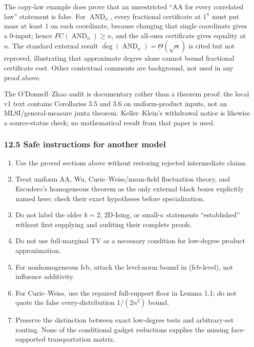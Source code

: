 The copy-law example does prove that an unrestricted ``AA for every correlated law'' statement is false. For \(\operatorname{AND}_n\), every fractional certificate at \(1^n\) must put mass at least \(1\) on each coordinate, because changing that single coordinate gives a 0-input; hence \(FC(\operatorname{AND}_n)\ge n\), and the all-ones certificate gives equality at \(n\). The standard external result \(\widetilde{\deg}(\operatorname{AND}_n)=\Theta(\sqrt n)\) is cited but not reproved, illustrating that approximate degree alone cannot bound fractional certificate cost. Other contextual comments are background, not used in any proof above.

The O'Donnell--Zhao audit is documentary rather than a theorem proof: the local v1 text contains Corollaries 3.5 and 3.6 on uniform-product inputs, not an MLSI/general-measure junta theorem. Keller--Klein's withdrawal notice is likewise a source-status check; no mathematical result from that paper is used.

\subsubsection{12.5 Safe instructions for another model}\label{safe-instructions-for-another-model}

\begin{enumerate}
\def\labelenumi{\arabic{enumi}.}
\tightlist
\item
  Use the proved sections above without restoring rejected intermediate claims.
\item
  Treat uniform AA, Wu, Curie--Weiss/mean-field fluctuation theory, and Escudero's homogeneous theorem as the only external black boxes explicitly named here; check their exact hypotheses before specialization.
\item
  Do not label the older \(k=2\), 2D-Ising, or small-\(\kappa\) statements ``established'' without first supplying and auditing their complete proofs.
\item
  Do not use full-marginal TV as a necessary condition for low-degree product approximation.
\item
  For nonhomogeneous fcb, attack the level-norm bound in (fcb-level), not influence additivity.
\item
  For Curie--Weiss, use the repaired full-support floor in Lemma 1.1; do not quote the false every-distribution \(1/(2n^2)\) bound.
\item
  Preserve the distinction between exact low-degree tests and arbitrary-set routing. None of the conditional gadget reductions supplies the missing face-supported transportation matrix.
\end{enumerate}

